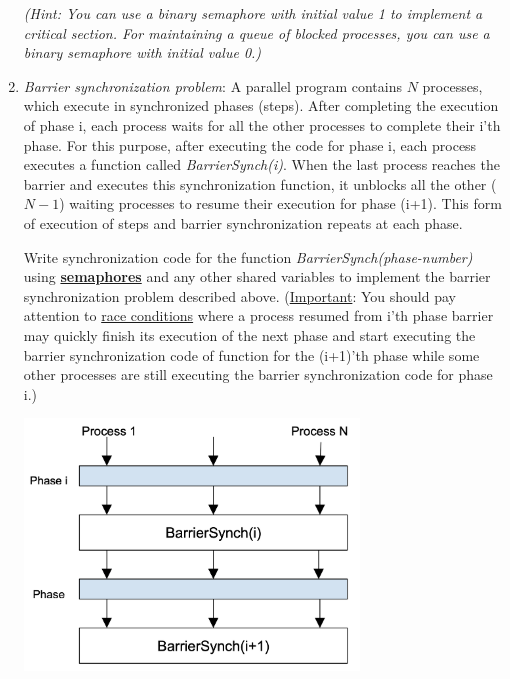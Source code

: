 \documentclass[11pt]{article}
\begin{document}
\begin{enumerate}
    \textit{(Hint: You can use a binary semaphore with initial value 1 to implement a critical section.  For maintaining a queue of blocked processes, you can use a binary semaphore with initial value 0.)}
    \newpage

  \item \textit{Barrier synchronization problem}: A parallel program contains \(N\) processes, which execute in synchronized phases (steps).  After completing the execution of phase i, each process waits for all the other processes to complete their i’th phase. For this purpose, after executing the code for phase i, each process executes a function called \textit{BarrierSynch(i)}.  When the last process reaches the barrier and executes this synchronization function, it unblocks all the other (\(N-1\)) waiting processes to resume their execution for phase (i+1). This form of execution of steps and barrier synchronization repeats at each phase.

    Write synchronization code for the function \textit{BarrierSynch(phase-number)} using \textbf{\ul{semaphores}} and any other shared variables to implement the barrier synchronization problem described above.  (\ul{Important}: You should pay attention to \ul{race conditions} where a process resumed from i’th phase barrier may quickly finish its execution of the next phase and start executing the barrier synchronization code of function for the (i+1)’th phase while some other processes are still executing the barrier synchronization code for phase i.)

    \begin{center}
      \includegraphics[width=0.7\textwidth]{barrier-sync.png}
    \end{center}
    \newpage
    

\end{enumerate}
\end{document}
